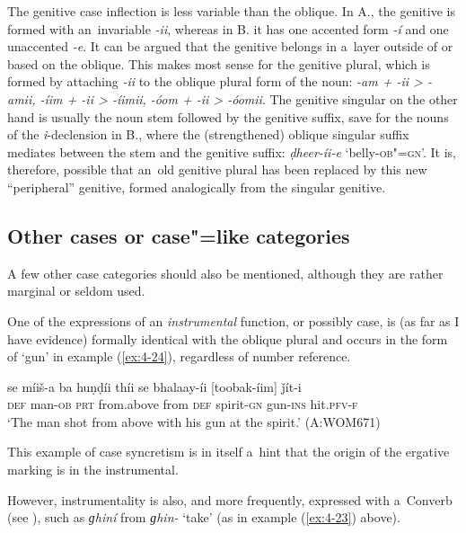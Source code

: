 The genitive case inflection is less variable than the oblique. In A., the genitive is formed with an~invariable \textit{-ii}, whereas in B. it has one accented form \textit{-í} and one unaccented \textit{-e}. It can be argued that the genitive belongs in a~layer outside of or based on the oblique. This makes most sense for the genitive plural, which is formed by attaching \textit{-ii} to the oblique plural form of the noun: \textit{-am + -ii {\textgreater} -amii, -íim + -ii {\textgreater} -íimii, -óom + -ii {\textgreater} -óomii}. The genitive singular on the other hand is usually the noun stem followed by the genitive suffix, save for the nouns of the \textit{i}-declension in B., where the (strengthened) oblique singular suffix mediates between the stem and the genitive suffix: \textit{ḍheer-íi-e} `belly-\textsc{ob"=gn}'. It is, therefore, possible that an~old genitive plural has been replaced by this new ``peripheral'' genitive, formed analogically from the singular genitive.

\subsection{Other cases or case"=like categories}
\label{subsec:4-5-4}

A few other case categories should also be mentioned, although they are rather marginal or seldom used. 


One of the expressions of an \textit{instrumental} function, or possibly case, is (as far as I have evidence) formally identical with the oblique plural and occurs in the form of `gun' in example (\ref{ex:4-24}), regardless of number reference. 


\begin{exe}
\ex
\label{ex:4-24}
\gll se míiš-a ba huṇḍíi thíi se bhalaay-íi [toobak-íim] ǰít-i \\
	\textsc{def} man-\textsc{ob} \textsc{prt} from.above from \textsc{def} spirit-\textsc{gn} gun-\textsc{ins} hit.\textsc{pfv-f}\\
\glt `The man shot from above with his gun at the spirit.' (A:WOM671)
\end{exe}

This example of case syncretism is in itself a~hint that the origin of the ergative marking is in the instrumental. 


However, instrumentality is also, and more frequently, expressed with a~Converb (see ), such as \textit{ɡhiní} from \textit{ɡhin-} `take' (as in example (\ref{ex:4-23}) above).


